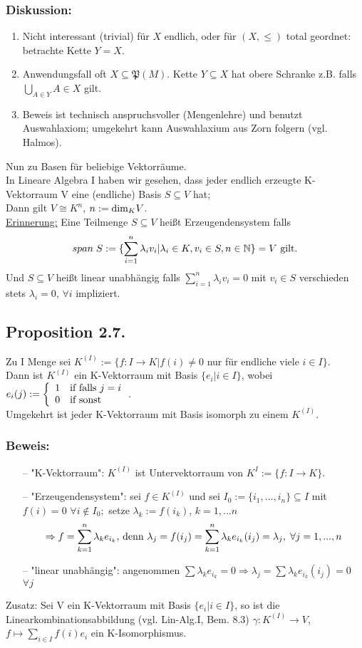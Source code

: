 \documentclass {article}
\newcommand{\twopartdef}[4] {
	\left\{
		\begin{array}{ll}
			#1 & \mbox{if } #2 \\
			#3 & \mbox{if } #4
		\end{array}
	\right.
}
\newcommand{\tn}[1]{\textnormal {#1}}
\begin{document}
\subsubsection*{Diskussion:}
\begin{enumerate}[label=(\arabic*)]
\item Nicht interessant (trivial) für $X$ endlich, oder für $(X,\leq )$ total geordnet: betrachte Kette $Y=X$.
\item Anwendungsfall oft $X\subseteq \mathfrak P(M)$. Kette $Y\subseteq X$ hat obere Schranke z.B. 
falls $\bigcup_{A\in Y}A\in X$ gilt.
\item Beweis ist technisch anspruchsvoller (Mengenlehre) und benutzt Auswahlaxiom; umgekehrt kann Auswahlaxium aus Zorn folgern (vgl. Halmos).
\end{enumerate}
Nun zu Basen für beliebige Vektorräume. \\
In Lineare Algebra I haben wir gesehen, dass jeder endlich erzeugte K-Vektorraum V eine (endliche) Basis $S\subseteq V$ hat; \\
Dann gilt $V\cong K^n$, $n:=\tn{dim}_KV$.\\
\underline{Erinnerung:} Eine Teilmenge $S\subseteq V$ heißt Erzeugendensystem falls 
$$span \hspace*{1mm} S := \{\sum_{i=1}^n
\lambda_i v_i | \lambda_i \in K, v_i \in S, n \in \mathbb N\} = V \tn{ gilt.}$$
Und $S\subseteq V$ heißt linear unabhängig falls $\sum_{i=1}^n \lambda_i v_i = 0$ mit $v_i\in S$ verschieden stets $\lambda_i = 0$, $\forall i$ impliziert.
\subsection*{Proposition 2.7.}
Zu I Menge sei $K^{(I)} := \{f:I\rightarrow K | f(i) \neq 0$ nur für endliche viele $i\in I\}$. \\
Dann ist $K^{(I)}$ ein K-Vektorraum mit Basis $\{e_i|i\in I\}$, wobei $e_i(j):= \twopartdef { 1 } {\tn{falls } j=i} {0} {\tn{sonst}}$. \\
Umgekehrt ist jeder K-Vektorraum mit Basis isomorph zu einem $K^{(I)}$.
\subsubsection*{Beweis:}
\begin{itemize}
\item[--] "K-Vektorraum": $K^{(I)}$ ist Untervektorraum von $K^I := \{f:I\rightarrow K\}$.
\item[--] "Erzeugendensystem": sei $f\in K^{(I)}$ und sei $I_0 := \{i_1,...,i_n\} \subseteq I$ mit $f(i) = 0$ $\forall i \notin I_0;$ setze $\lambda_k := f(i_k)$, $k=1,...n$ 
$$ \Rightarrow f = \sum_{k=1}^n \lambda_k e_{i_k}\tn{, denn }\lambda_j = f(i_j) = \sum_{k=1}^n \lambda_k e_{i_k}(i_j) = \lambda_j, \hspace*{1mm} \forall j = 1,...,n$$
\item[--] "linear unabhängig": angenommen $\sum \lambda_k e_{i_k} = 0 \Rightarrow \lambda_j = \sum \lambda_k e_{i_k}(i_j) = 0$ $\forall j$
\end{itemize}
Zusatz: Sei V ein K-Vektorraum mit Basis $\{e_i | i \in I\}$, so ist die Linearkombinationsabbildung (vgl. Lin-Alg.I, Bem. 8.3)
$\gamma: K^{(I)} \rightarrow V$, $f\mapsto \sum_{i\in I} f(i)e_i$ ein K-Isomorphismus.
\end{document}
